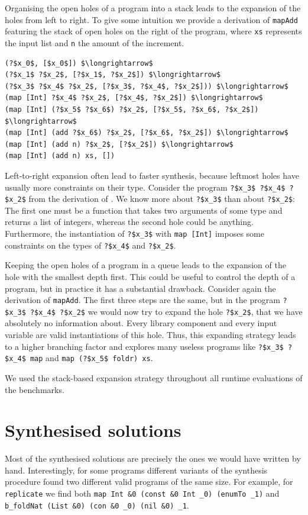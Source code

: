 Organising the open holes of a program into a stack leads to the expansion of the holes from left to right. To give some intuition we provide a derivation of \lstinline?mapAdd? featuring the stack of open holes on the right of the program, where \lstinline?xs? represents the input list and \lstinline?n? the amount of the increment.
\begin{lstlisting}[style=plain]
(?$x_0$, [$x_0$]) $\longrightarrow$
(?$x_1$ ?$x_2$, [?$x_1$, ?$x_2$]) $\longrightarrow$
(?$x_3$ ?$x_4$ ?$x_2$, [?$x_3$, ?$x_4$, ?$x_2$])) $\longrightarrow$
(map [Int] ?$x_4$ ?$x_2$, [?$x_4$, ?$x_2$]) $\longrightarrow$
(map [Int] (?$x_5$ ?$x_6$) ?$x_2$, [?$x_5$, ?$x_6$, ?$x_2$]) $\longrightarrow$
(map [Int] (add ?$x_6$) ?$x_2$, [?$x_6$, ?$x_2$]) $\longrightarrow$
(map [Int] (add n) ?$x_2$, [?$x_2$]) $\longrightarrow$
(map [Int] (add n) xs, [])
\end{lstlisting}
Left-to-right expansion often lead to faster synthesis, because leftmost holes have usually more constraints on their type. Consider the program \lstinline!?$x_3$ ?$x_4$ ?$x_2$! from the derivation of \lstinline??. We know more about \lstinline!?$x_3$! than about \lstinline!?$x_2$!: The first one must be a function that takes two arguments of some type and returns a list of integers, whereas the second hole could be anything. Furthermore, the instantiation of \lstinline!?$x_3$! with \lstinline?map [Int]? imposes some constraints on the types of \lstinline!?$x_4$! and \lstinline!?$x_2$!.

Keeping the open holes of a program in a queue leads to the expansion of the hole with the smallest depth first. This could be useful to control the depth of a program, but in practice it has a substantial drawback. Consider again the derivation of \lstinline?mapAdd?. The first three steps are the same, but in the program \lstinline!?$x_3$ ?$x_4$ ?$x_2$! we would now try to expand the hole \lstinline!?$x_2$!, that we have absolutely no information about. Every library component and every input variable are valid instantiations of this hole. Thus, this expanding strategy leads to a higher branching factor and explores many useless programs like \lstinline!?$x_3$ ?$x_4$ map! and \lstinline!map (?$x_5$ foldr) xs!.

We used the stack-based expansion strategy throughout all runtime evaluations of the benchmarks.

\section{Synthesised solutions}
Most of the synthesised solutions are precisely the ones we would have written by hand. Interestingly, for some programs different variants of the synthesis procedure found two different valid programs of the same size. For example, for \lstinline?replicate? we find both \lstinline?map Int &0 (const &0 Int _0) (enumTo _1)? and \lstinline?b_foldNat (List &0) (con &0 _0) (nil &0) _1?.

